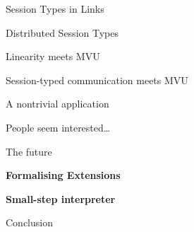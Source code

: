 \documentclass[11.5pt, aspectratio=169]{beamer}
\begin{document}
\begin{frame}{Session Types in Links}
\end{frame}

\begin{frame}{Distributed Session Types}
\end{frame}

\begin{frame}{Linearity meets MVU}
\end{frame}

\begin{frame}{Session-typed communication meets MVU}
\end{frame}

\begin{frame}{A nontrivial application}
\end{frame}

\begin{frame}{People seem interested\ldots}
\end{frame}


\begin{frame}{The future}
  \begin{fullpageitemize}
    \item {\large \textbf{Formalising Extensions}}
    \item {\large \textbf{Small-step interpreter}}
  \end{fullpageitemize}
\end{frame}

\begin{frame}{Conclusion}
\end{frame}
\end{document}
